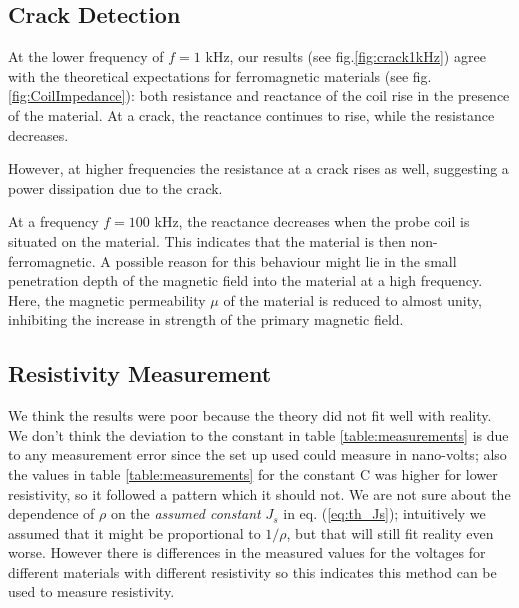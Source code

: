 \subsection{Crack Detection}
At the lower frequency of $f=1$ kHz, our results (see fig.\ref{fig:crack1kHz}) agree with the theoretical expectations for ferromagnetic materials (see fig.\ref{fig:CoilImpedance}): both resistance and reactance of the coil rise in the presence of the material. At a crack, the reactance continues to rise, while the resistance decreases. %
\par
However, at higher frequencies the resistance at a crack rises as well, suggesting a power dissipation due to the crack.
\par
At a frequency $f=100$ kHz, the reactance decreases when the probe coil is situated on the material. This indicates that the material is then non-ferromagnetic. A possible reason for this behaviour might lie in the small penetration depth of the magnetic field into the material at a high frequency. Here, the magnetic permeability $\mu$ of the material is reduced to almost unity\cite{feromagnetism}, inhibiting the increase in strength of the primary magnetic field. 

\subsection{Resistivity Measurement}
We think the results were poor because the theory did not fit well with reality.
We don't think the deviation to the constant in table \ref{table:measurements} is due to any measurement error since the set up used could measure in nano-volts; also the values in table \ref{table:measurements} for the constant C was higher for lower resistivity, so it followed a pattern which it should not. 
We are not sure about the dependence of $\rho$ on the \emph{assumed constant} $J_s$ in eq. (\ref{eq:th_Js}); intuitively we assumed that it might be proportional to $1/\rho$, but that will still fit reality even worse.
However there is differences in the measured values for the voltages for different materials with different resistivity
so this indicates this method can be used to measure resistivity.